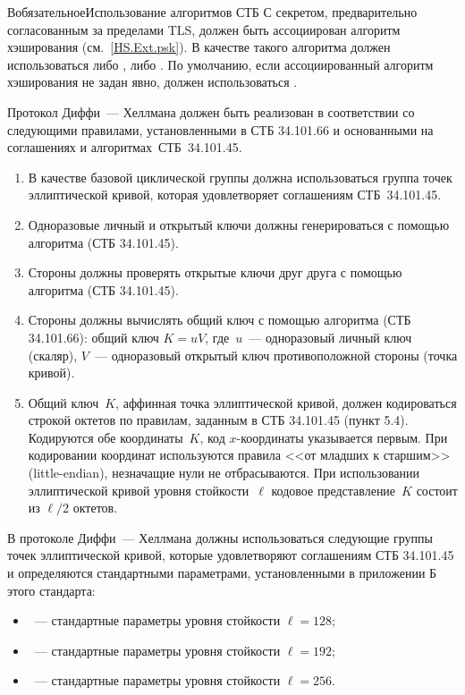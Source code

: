 \begin{appendix}{В}{обязательное}{Использование алгоритмов СТБ}
С секретом, предварительно согласованным за пределами TLS, должен быть 
ассоциирован алгоритм хэширования (см.~\ref{HS.Ext.psk}). В качестве такого 
алгоритма должен использоваться либо , либо .
%
По умолчанию, если ассоциированный алгоритм хэширования не задан явно, должен 
использоваться .

\label{BSUITES.DH}

Протокол Диффи~--- Хеллмана должен быть реализован в соответствии со следующими 
правилами, установленными в СТБ 34.101.66 и основанными на соглашениях и 
алгоритмах~СТБ~34.101.45.

\begin{enumerate}
\item
В качестве базовой циклической группы должна использоваться группа точек 
эллиптической кривой, которая удовлетворяет соглашениям СТБ~34.101.45.

\item
Одноразовые личный и открытый ключи должны генерироваться с помощью алгоритма
 (СТБ 34.101.45).

\item
Стороны должны проверять открытые ключи друг друга с помощью алгоритма
 (СТБ 34.101.45).

\item
Стороны должны вычислять общий ключ с помощью алгоритма  (СТБ
34.101.66): общий ключ $K=uV$, где~$u$~--- одноразовый личный ключ (скаляр),
$V$~--- одноразовый открытый ключ противоположной стороны (точка кривой).

\item
Общий ключ~$K$, аффинная точка эллиптической кривой, должен кодироваться строкой
октетов по правилам, заданным в СТБ 34.101.45 (пункт 5.4). Кодируются обе
координаты~$K$, код $x$-координаты указывается первым. При кодировании координат
используются правила <<от младших к старшим>> (little-endian), незначащие нули
не отбрасываются. При использовании эллиптической кривой уровня стойкости~$\ell$
кодовое представление~$K$ состоит из $\ell/2$ октетов.
\end{enumerate}

\label{BSUITES.Groups}

В протоколе Диффи~--- Хеллмана должны использоваться следующие группы точек 
эллиптической кривой, которые удовлетворяют соглашениям СТБ 34.101.45 и 
определяются стандартными параметрами, установленными в приложении Б этого 
стандарта:
\begin{itemize}
\item
{}~--- стандартные параметры уровня стойкости $\ell=128$;
\item
{}~--- стандартные параметры уровня стойкости $\ell=192$;
\item
{}~--- стандартные параметры уровня стойкости $\ell=256$.
\end{itemize}


\end{appendix}
